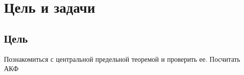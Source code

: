 \chapter*{Цель и задачи}
\label{ch:intro}

\section{Цель}
Познакомиться с центральной предельной теоремой и проверить ее. Посчитать АКФ
\endinput